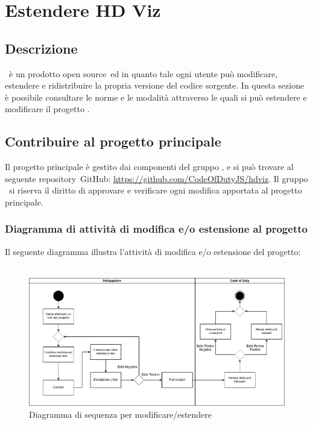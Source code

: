 \section{Estendere HD Viz}
    \subsection{Descrizione}
    \hd\ è un prodotto open source\glo\ ed in quanto tale ogni utente può modificare, estendere e ridistribuire la propria versione del codice sorgente. In questa sezione è possibile consultare le norme e le modalità attraverso le quali si può estendere e modificare il progetto \hd .
    \subsection{Contribuire al progetto principale}
    Il progetto principale è gestito dai componenti del gruppo \cod , e si può trovare al seguente repository\glo\ GitHub\glo : \href{https://github.com/CodeOfDutyJS/hdviz}{https://github.com/CodeOfDutyJS/hdviz}.
    Il gruppo \cod\ si riserva il diritto di approvare e verificare ogni modifica apportata al progetto principale.
        \subsubsection{Diagramma di attività di modifica e/o estensione al progetto}
        Il seguente diagramma illustra l'attività di modifica e/o estensione del progetto:
        \\
        \\
        \begin{figure}[H]
            \centering\includegraphics[width=1\textwidth]{source/img/estensione_progetto.png}
            \caption{Diagramma di sequenza per modificare/estendere \hd}
        \end{figure}
